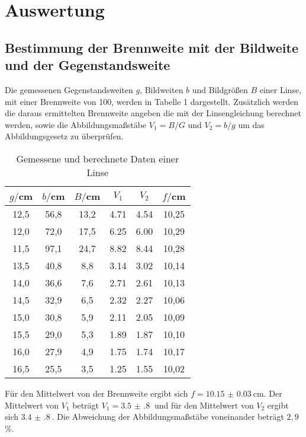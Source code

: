 \section{Auswertung}
\label{sec:Auswertung}

\subsection{Bestimmung der Brennweite mit der Bildweite und der Gegenstandsweite}

Die gemessenen Gegenstandsweiten $g$, Bildweiten $b$ und Bildgrößen $B$ einer Linse, mit einer
Brennweite von 100, werden in Tabelle 1 dargestellt. Zusätzlich werden die daraus ermittelten
Brennweite angeben die mit der Linsengleichung berechnet werden, sowie die Abbildungsmaßstäbe $V_1 = B/G$ und $V_2=b/g$
um das Abbildungsgesetz zu überprüfen.
\begin{table}[H]
  \centering
  \caption{Gemessene und berechnete Daten einer Linse}
  \label{tab:Widerstand}
  \begin{tabular}{c c c c c c}
    \toprule
    $g/$cm  & $b/$cm & $B / $cm & $V_1$ & $V_2$ & $f/$cm \\
    \midrule
    12,5 &    56,8  & 13,2 & 4.71 &   4.54   &  10,25   \\
    12,0 &    72,0  & 17,5 & 6.25 &   6.00   &  10,29   \\
    11,5 &    97,1  & 24,7 & 8.82 &   8.44   &  10,28   \\
    13,5 &    40,8  & 8,8  & 3.14 &   3.02   &  10,14  \\
    14,0 &    36,6  & 7,6  & 2.71 &   2.61   &  10,13  \\
    14,5 &    32,9  & 6,5  & 2.32 &   2.27   &  10,06  \\
    15,0 &    30,8  & 5,9  & 2.11 &   2.05   &  10,09  \\
    15,5 &    29,0  & 5,3  & 1.89 &   1.87   &  10,10  \\
    16,0 &    27,9  & 4,9  & 1.75 &   1.74   &  10,17  \\
    16,5 &    25,5  & 3,5  & 1.25 &   1.55   &  10,02  \\
    \bottomrule
  \end{tabular}
\end{table}



Für den Mittelwert von der Brennweite ergibt sich $f = \SI{10.15(3)}{\centi\meter}$. Der
Mittelwert von $V_1$ beträgt $V_1 = \SI{3.5(8)}{}$ und für den Mittelwert von $V_2$ ergibt sich
$\SI{3.4(8)}{}$.
Die Abweichung der Abbildungsmaßstäbe voneinander beträgt $2,9$\%.

